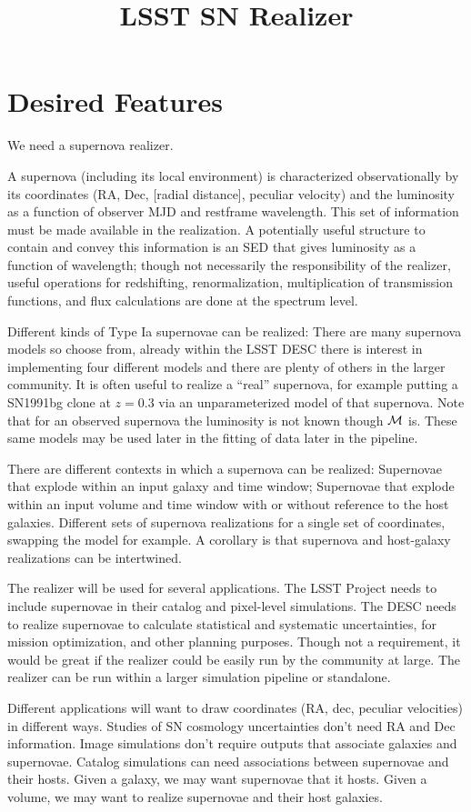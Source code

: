 \documentclass[preprint]{aastex}
\begin{document}
\title{LSST SN Realizer}

\section{Desired Features}
We need a supernova realizer.

A supernova (including its local environment) is characterized observationally by
its coordinates (RA, Dec, [radial distance], peculiar velocity) and the luminosity as a
function of observer MJD and restframe wavelength.  This set of information must be
made available in the realization.  A potentially useful structure to contain and convey
this information is an SED that gives luminosity as a function of wavelength; though
not necessarily the responsibility of the realizer, useful operations for redshifting,
renormalization, multiplication of transmission functions, and flux calculations
are done at the spectrum level.

Different kinds of Type Ia supernovae can be realized:
There are many
supernova models so choose from, already within the LSST DESC there is interest
in implementing four different models and there are plenty of others in the larger community.
It is often useful to realize a ``real'' supernova, for example putting a SN1991bg clone
at $z=0.3$ via an unparameterized model of that supernova. Note that for an observed
supernova the luminosity is not known though $\cal{M}$ is.
These same models may be used later in the fitting of data later in the pipeline.

There are different contexts in which a supernova can be realized:
Supernovae that explode within an input galaxy and time window;
Supernovae that explode within an input volume and time window
with or without reference to the host galaxies.  Different sets of supernova
realizations for a single set of coordinates, 
swapping the model for example.
A corollary is that supernova and host-galaxy realizations can be intertwined.

The realizer will be used for several applications.  The LSST Project needs to include
supernovae in their catalog and pixel-level simulations.  The DESC needs to realize
supernovae to calculate statistical and systematic uncertainties, for mission optimization,
and other planning purposes.  Though not a requirement, it would be great
if the realizer could be easily run by the community at large.
The realizer can be run within a larger simulation pipeline or standalone.

Different applications will want to draw coordinates (RA, dec, peculiar velocities) in different ways.
Studies of SN cosmology uncertainties don't need RA and Dec information. Image simulations don't require outputs that associate galaxies and supernovae. Catalog simulations can need associations between supernovae and their hosts.  Given a galaxy, we may want supernovae
that it hosts.  Given a volume, we may want to realize supernovae and their host galaxies.
\end{document}
